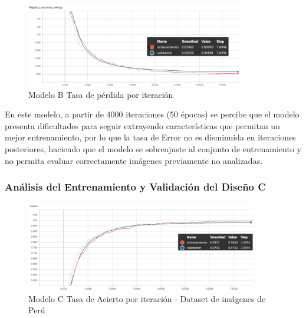 			
			\begin{figure}[H]
				\begin{center}
				\includegraphics[width=0.85\textwidth]{images/desarrollo/trainResults/peru/modelBLoss} 
				\end{center}
				\begin{center}
				\caption{\small{Modelo B Tasa de pérdida por iteración}}
				
				{\small{\fontsize{10}{16.8}\selectfont {Fuente: Elaboración propia}}}
				\end{center}
				\vspace{-1.5em}
			\end{figure}

			En este modelo, a partir de 4000 iteraciones (50 épocas) se percibe que el modelo presenta dificultades para seguir extrayendo características que permitan un mejor entrenamiento, por lo que la tasa de Error no es disminuida en iteraciones posteriores, haciendo que el modelo se sobreajuste al conjunto de entrenamiento y no permita evaluar correctamente imágenes previamente no analizadas.



		\subsubsection{Análisis del Entrenamiento y Validación del Diseño C} 

			\begin{figure}[H]
				\begin{center}
				\includegraphics[width=0.9\textwidth]{images/desarrollo/trainResults/peru/modelCAcierto} 
				\end{center}
				\begin{center}
				\caption{\small{Modelo C Tasa de Acierto por iteración - Dataset de imágenes de Perú  }}
				
				{\small{\fontsize{10}{16.8}\selectfont {Fuente: Elaboración propia}}}
				\end{center}
				\vspace{-1.5em}
			\end{figure}
			
